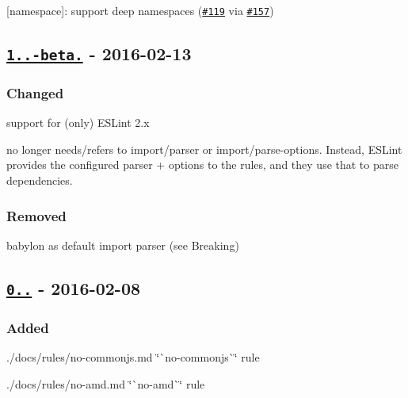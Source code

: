 \begin{DoxyItemize}
\item \mbox{[}{\ttfamily namespace}\mbox{]}\+: support deep namespaces (\href{https://github.com/benmosher/eslint-plugin-import/issues/119}{\tt \#119} via \href{https://github.com/benmosher/eslint-plugin-import/pull/157}{\tt \#157})
\end{DoxyItemize}

\subsection*{\href{https://github.com/benmosher/eslint-plugin-import/compare/v0.13.0...v1.0.0-beta.0}{\tt 1..-\/beta.} -\/ 2016-\/02-\/13}

\subsubsection*{Changed}


\begin{DoxyItemize}
\item support for (only) E\+S\+Lint 2.\+x
\item no longer needs/refers to {\ttfamily import/parser} or {\ttfamily import/parse-\/options}. Instead, E\+S\+Lint provides the configured parser + options to the rules, and they use that to parse dependencies.
\end{DoxyItemize}

\subsubsection*{Removed}


\begin{DoxyItemize}
\item {\ttfamily babylon} as default import parser (see Breaking)
\end{DoxyItemize}

\subsection*{\href{https://github.com/benmosher/eslint-plugin-import/compare/v0.12.1...v0.13.0}{\tt 0..} -\/ 2016-\/02-\/08}

\subsubsection*{Added}


\begin{DoxyItemize}
\item ./docs/rules/no-\/commonjs.md \char`\"{}\`{}no-\/commonjs\`{}\char`\"{} rule
\item ./docs/rules/no-\/amd.md \char`\"{}\`{}no-\/amd\`{}\char`\"{} rule
\end{DoxyItemize}

